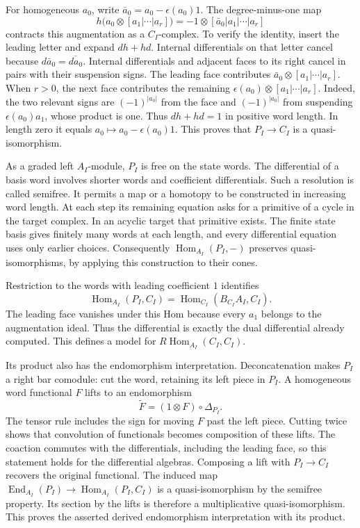 For homogeneous $a_0$, write
$\bar a_0=a_0-\epsilon(a_0)1$.
The degree-minus-one map
\[
 h\bigl(a_0\otimes[a_1|\cdots|a_r]\bigr)
 =-1\otimes[\bar a_0|a_1|\cdots|a_r]
\]
contracts this augmentation as a $C_I$-complex.
To verify the identity, insert the leading letter and expand
$dh+hd$.
Internal differentials on that letter cancel because
$d\bar a_0=\overline{da_0}$.
Internal differentials and adjacent faces to its right cancel
in pairs with their suspension signs.
The leading face contributes
$\bar a_0\otimes[a_1|\cdots|a_r]$.
When $r>0$, the next face contributes the remaining
$\epsilon(a_0)\otimes[a_1|\cdots|a_r]$.
Indeed, the two relevant signs are $(-1)^{|a_0|}$ from the face
and $(-1)^{|a_0|}$ from suspending
$\epsilon(a_0)a_1$, whose product is one.
Thus $dh+hd=1$ in positive word length.
In length zero it equals $a_0\mapsto a_0-\epsilon(a_0)1$.
This proves that $P_I\to C_I$ is a quasi-isomorphism.

As a graded left $A_I$-module, $P_I$ is free on the state words.
The differential of a basis word involves shorter words and
coefficient differentials.
Such a resolution is called semifree.
It permits a map or a homotopy to be constructed in increasing
word length. At each step its remaining equation asks for a
primitive of a cycle in the target complex.
In an acyclic target that primitive exists.
The finite state basis gives finitely many words at each length,
and every differential equation uses only earlier choices.
Consequently $\operatorname{Hom}_{A_I}(P_I,-)$ preserves
quasi-isomorphisms, by applying this construction to their cones.

Restriction to the words with leading coefficient $1$ identifies
\[
 \operatorname{Hom}_{A_I}(P_I,C_I)
 =\operatorname{Hom}_{C_I}(B_{C_I}A_I,C_I).
\]
The leading face vanishes under this Hom because every $a_1$
belongs to the augmentation ideal.
Thus the differential is exactly the dual differential already
computed. This defines a model for
$R\operatorname{Hom}_{A_I}(C_I,C_I)$.

Its product also has the endomorphism interpretation.
Deconcatenation makes $P_I$ a right bar comodule: cut the word,
retaining its left piece in $P_I$.
A homogeneous word functional $F$ lifts to an endomorphism
\[
 \widetilde F=(1\otimes F)\circ\Delta_{P_I}.
\]
The tensor rule includes the sign for moving $F$ past the left
piece. Cutting twice shows that convolution of functionals
becomes composition of these lifts.
The coaction commutes with the differentials, including the
leading face, so this statement holds for the differential algebras.
Composing a lift with $P_I\to C_I$ recovers the original functional.
The induced map
$\operatorname{End}_{A_I}(P_I)\to
\operatorname{Hom}_{A_I}(P_I,C_I)$
is a quasi-isomorphism by the semifree property.
Its section by the lifts is therefore a multiplicative
quasi-isomorphism. This proves the asserted derived endomorphism
interpretation with its product.

